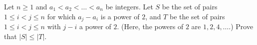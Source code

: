 Let $n\ge 1$ and $a_1<a_2<\dots<a_n$ be integers. Let $S$ be the set of pairs $1\le i<j\le n$ for which $a_j-a_i$ is a power of $2$, and $T$ be the set of pairs $1\le i<j\le n$ with $j-i$ a power of $2$. (Here, the powers of $2$ are $1,2,4,\dots$.) Prove that $|S|\le |T|$.